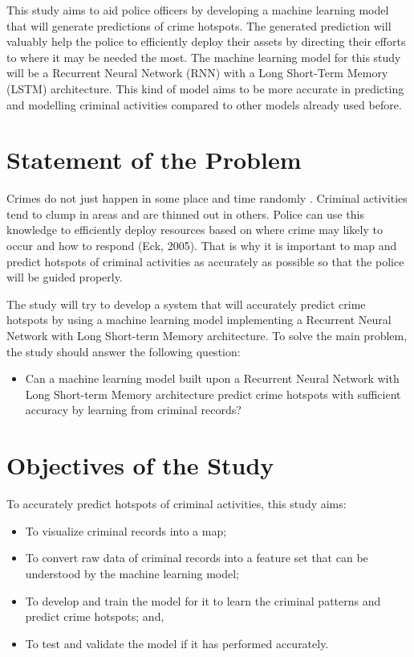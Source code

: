     This study aims to aid police officers by developing a machine learning model that will generate predictions of crime hotspots. The generated prediction will valuably help the police to efficiently deploy their assets by directing their efforts to where it may be needed the most. The machine learning model for this study will be a Recurrent Neural Network (RNN) with a Long Short-Term Memory (LSTM) architecture. This kind of model aims to be more accurate in predicting and modelling criminal activities compared to other models already used before.

\section{Statement of the Problem} %

    Crimes do not just happen in some place and time randomly \cite{brantingham2005modeling}. Criminal activities tend to clump in areas and are thinned out in others. Police can use this knowledge to efficiently deploy resources based on where crime may likely to occur and how to respond (Eck, 2005). That is why it is important to map and predict hotspots of criminal activities as accurately as possible so that the police will be guided properly.

    The study will try to develop a system that will accurately predict crime hotspots by using a machine learning model implementing a Recurrent Neural Network with Long Short-term Memory architecture. To solve the main problem, the study should answer the following question:
        \begin{itemize}
        \item Can a machine learning model built upon a Recurrent Neural Network with Long Short-term Memory architecture predict crime hotspots with sufficient accuracy by learning from criminal records?
        \end{itemize}

\section{Objectives of the Study} %

To accurately predict hotspots of criminal activities, this study aims:
        \begin{itemize}
        \item To visualize criminal records into a map;
        \item To convert raw data of criminal records into a feature set that can be understood by the machine learning model;
        \item To develop and train the model for it to learn the criminal patterns and predict crime hotspots; and,
        \item To test and validate the model if it has performed accurately.
        \end{itemize}

